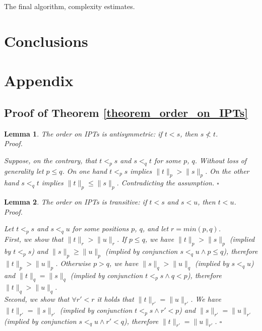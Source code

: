 \documentclass[AMA,STIX1COL]{WileyNJD-v2}
\newtheorem{XLem}{Lemma}
\begin{document}
The final algorithm, complexity estimates.

\section{Conclusions}

\FloatBarrier
\pagebreak

\section*{Appendix}

\subsection*{Proof of Theorem \ref{theorem_order_on_IPTs}}

    \begin{XLem}\label{lemma_ptorder_antisymmetry}
    The order on IPTs is antisymmetric: if $t < s$, then $s \not< t$.
    \\
    Proof.

    Suppose, on the contrary, that $t <_p s$ and $s <_q t$ for some $p$, $q$.
    Without loss of generality let $p \leq q$.
    On one hand $t <_p s$ implies $\|t\|_p > \|s\|_p$.
    On the other hand $s <_q t$ implies $\|t\|_p \leq \|s\|_p$.
    Contradicting the assumption.
    $\square$
    \end{XLem}

    \begin{XLem}\label{lemma_ptorder_transitivity}
    The order on IPTs is transitive: if $t < s$ and $s < u$, then $t < u$.
    \\
    Proof.

    Let $t <_p s$ and $s <_q u$ for some positions $p$, $q$, and let $r = min (p, q)$.
    \\[-1em]

    First, we show that $\|t\|_r > \|u\|_r$.
    If $p \leq q$, we have $\|t\|_p > \|s\|_p$ (implied by $t <_p s$)
    and $\|s\|_p \geq \|u\|_p$ (implied by conjunction $s <_q u \wedge p \leq q$),
    therefore $\|t\|_p > \|u\|_p$.
    Otherwise $p > q$, we have $\|s\|_q > \|u\|_q$ (implied by $s <_q u$)
    and $\|t\|_q = \|s\|_q$ (implied by conjunction $t <_p s \wedge q < p$),
    therefore $\|t\|_q > \|u\|_q$.
    \\[-1em]

    Second, we show that $\forall r' < r$ it holds that $\|t\|_{r'} = \|u\|_{r'}$.
    We have $\|t\|_{r'} = \|s\|_{r'}$ (implied by conjunction $t <_p s \wedge r' < p$)
    and $\|s\|_{r'} = \|u\|_{r'}$ (implied by conjunction $s <_q u \wedge r' < q$),
    therefore $\|t\|_{r'} = \|u\|_{r'}$.
    $\square$
    \end{XLem}
\end{document}
